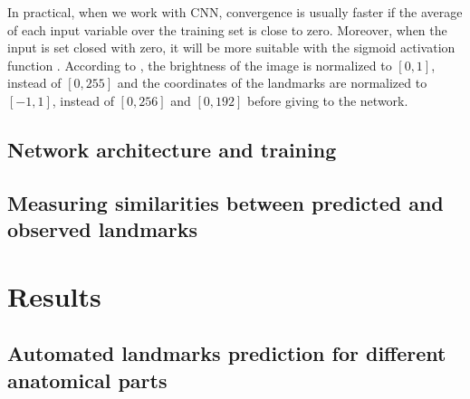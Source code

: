 \documentclass[review]{elsarticle}
\begin{document}
In practical, when we work with CNN, convergence is usually faster if the average of each input variable over the training set is close to zero. Moreover, when the input is set closed with zero, it will be more suitable with the sigmoid activation function \cite{lecun2012efficient}. According to \cite{lecun2012efficient}, the brightness of the image is normalized to $[0,1]$, instead of $[0,255]$ and the coordinates of the landmarks are normalized to $[-1,1]$, instead of $[0,256]$ and $[0,192]$ before giving to the network.

\subsection{Network architecture and training}

\subsection{Measuring similarities between predicted and observed landmarks}

\section{Results}

\subsection{Automated landmarks prediction for different anatomical parts}
\end{document}

